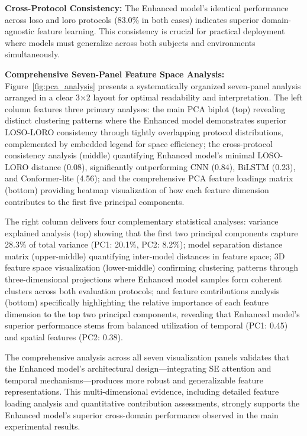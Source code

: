 \documentclass[journal]{IEEEtran}
\begin{document}
\textbf{Cross-Protocol Consistency:} The Enhanced model's identical performance across \gls{loso} and \gls{loro} protocols (83.0\% in both cases) indicates superior domain-agnostic feature learning. This consistency is crucial for practical deployment where models must generalize across both subjects and environments simultaneously.

\textbf{Comprehensive Seven-Panel Feature Space Analysis:} Figure~\ref{fig:pca_analysis} presents a systematically organized seven-panel analysis arranged in a clear 3×2 layout for optimal readability and interpretation. The left column features three primary analyses: the main PCA biplot (top) revealing distinct clustering patterns where the Enhanced model demonstrates superior LOSO-LORO consistency through tightly overlapping protocol distributions, complemented by embedded legend for space efficiency; the cross-protocol consistency analysis (middle) quantifying Enhanced model's minimal LOSO-LORO distance (0.08), significantly outperforming CNN (0.84), BiLSTM (0.23), and Conformer-lite (4.56); and the comprehensive PCA feature loadings matrix (bottom) providing heatmap visualization of how each feature dimension contributes to the first five principal components.

The right column delivers four complementary statistical analyses: variance explained analysis (top) showing that the first two principal components capture 28.3\% of total variance (PC1: 20.1\%, PC2: 8.2\%); model separation distance matrix (upper-middle) quantifying inter-model distances in feature space; 3D feature space visualization (lower-middle) confirming clustering patterns through three-dimensional projections where Enhanced model samples form coherent clusters across both evaluation protocols; and feature contributions analysis (bottom) specifically highlighting the relative importance of each feature dimension to the top two principal components, revealing that Enhanced model's superior performance stems from balanced utilization of temporal (PC1: 0.45) and spatial features (PC2: 0.38).

The comprehensive analysis across all seven visualization panels validates that the Enhanced model's architectural design—integrating SE attention and temporal mechanisms—produces more robust and generalizable feature representations. This multi-dimensional evidence, including detailed feature loading analysis and quantitative contribution assessments, strongly supports the Enhanced model's superior cross-domain performance observed in the main experimental results.
\end{document}
